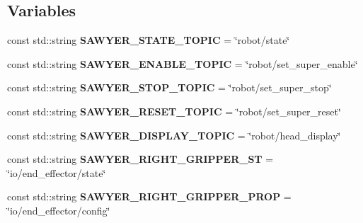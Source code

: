 \subsection*{Variables}
\begin{DoxyCompactItemize}
\item 
\hypertarget{namespacesawyer__en_af70566379520fa4f3b2a8e561482aac7}{const std\-::string {\bfseries S\-A\-W\-Y\-E\-R\-\_\-\-S\-T\-A\-T\-E\-\_\-\-T\-O\-P\-I\-C} = \char`\"{}robot/state\char`\"{}}\label{namespacesawyer__en_af70566379520fa4f3b2a8e561482aac7}

\item 
\hypertarget{namespacesawyer__en_a71a1bfc0fc10559b68e481b375b07f49}{const std\-::string {\bfseries S\-A\-W\-Y\-E\-R\-\_\-\-E\-N\-A\-B\-L\-E\-\_\-\-T\-O\-P\-I\-C} = \char`\"{}robot/set\-\_\-super\-\_\-enable\char`\"{}}\label{namespacesawyer__en_a71a1bfc0fc10559b68e481b375b07f49}

\item 
\hypertarget{namespacesawyer__en_a9066992e2570c641e3457f4d0bd75894}{const std\-::string {\bfseries S\-A\-W\-Y\-E\-R\-\_\-\-S\-T\-O\-P\-\_\-\-T\-O\-P\-I\-C} = \char`\"{}robot/set\-\_\-super\-\_\-stop\char`\"{}}\label{namespacesawyer__en_a9066992e2570c641e3457f4d0bd75894}

\item 
\hypertarget{namespacesawyer__en_a03eab39c4a42a0cd3e42c8ee7c7de9b4}{const std\-::string {\bfseries S\-A\-W\-Y\-E\-R\-\_\-\-R\-E\-S\-E\-T\-\_\-\-T\-O\-P\-I\-C} = \char`\"{}robot/set\-\_\-super\-\_\-reset\char`\"{}}\label{namespacesawyer__en_a03eab39c4a42a0cd3e42c8ee7c7de9b4}

\item 
\hypertarget{namespacesawyer__en_a7b5745b77a1be13d7fd9c032cc70ef9b}{const std\-::string {\bfseries S\-A\-W\-Y\-E\-R\-\_\-\-D\-I\-S\-P\-L\-A\-Y\-\_\-\-T\-O\-P\-I\-C} = \char`\"{}robot/head\-\_\-display\char`\"{}}\label{namespacesawyer__en_a7b5745b77a1be13d7fd9c032cc70ef9b}

\item 
\hypertarget{namespacesawyer__en_a4e3b916d988c7301e7a475801db02fc6}{const std\-::string {\bfseries S\-A\-W\-Y\-E\-R\-\_\-\-R\-I\-G\-H\-T\-\_\-\-G\-R\-I\-P\-P\-E\-R\-\_\-\-S\-T} = \char`\"{}io/end\-\_\-effector/state\char`\"{}}\label{namespacesawyer__en_a4e3b916d988c7301e7a475801db02fc6}

\item 
\hypertarget{namespacesawyer__en_a35626503feef1285820eda8a4aed3922}{const std\-::string {\bfseries S\-A\-W\-Y\-E\-R\-\_\-\-R\-I\-G\-H\-T\-\_\-\-G\-R\-I\-P\-P\-E\-R\-\_\-\-P\-R\-O\-P} = \char`\"{}io/end\-\_\-effector/config\char`\"{}}\label{namespacesawyer__en_a35626503feef1285820eda8a4aed3922}


\end{DoxyCompactItemize}
